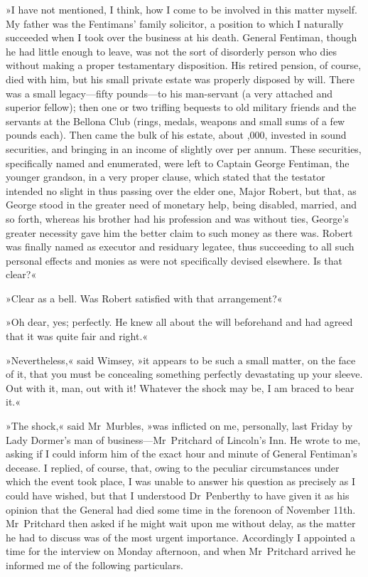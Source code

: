 »I have not mentioned, I think, how I come to be involved in this matter myself. My father was the Fentimans' family solicitor, a position to which I naturally succeeded when I took over the business at his death. General Fentiman, though he had little enough to leave, was not the sort of disorderly person who dies without making a proper testamentary disposition. His retired pension, of course, died with him, but his small private estate was properly disposed by will. There was a small legacy—fifty pounds—to his man-servant (a very attached and superior fellow); then one or two trifling bequests to old military friends and the servants at the Bellona Club (rings, medals, weapons and small sums of a few pounds each). Then came the bulk of his estate, about ,000, invested in sound securities, and bringing in an income of slightly over  per annum. These securities, specifically named and enumerated, were left to Captain George Fentiman, the younger grandson, in a very proper clause, which stated that the testator intended no slight in thus passing over the elder one, Major Robert, but that, as George stood in the greater need of monetary help, being disabled, married, and so forth, whereas his brother had his profession and was without ties, George's greater necessity gave him the better claim to such money as there was. Robert was finally named as executor and residuary legatee, thus succeeding to all such personal effects and monies as were not specifically devised elsewhere. Is that clear?«

»Clear as a bell. Was Robert satisfied with that arrangement?«

»Oh dear, yes; perfectly. He knew all about the will beforehand and had agreed that it was quite fair and right.«

»Nevertheless,« said Wimsey, »it appears to be such a small matter, on the face of it, that you must be concealing something perfectly devastating up your sleeve. Out with it, man, out with it! Whatever the shock may be, I am braced to bear it.«

»The shock,« said Mr~Murbles, »was inflicted on me, personally, last Friday by Lady Dormer's man of business—Mr~Pritchard of Lincoln's Inn. He wrote to me, asking if I could inform him of the exact hour and minute of General Fentiman's decease. I replied, of course, that, owing to the peculiar circumstances under which the event took place, I was unable to answer his question as precisely as I could have wished, but that I understood Dr~Penberthy to have given it as his opinion that the General had died some time in the forenoon of November 11th. Mr~Pritchard then asked if he might wait upon me without delay, as the matter he had to discuss was of the most urgent importance. Accordingly I appointed a time for the interview on Monday afternoon, and when Mr~Pritchard arrived he informed me of the following particulars.

